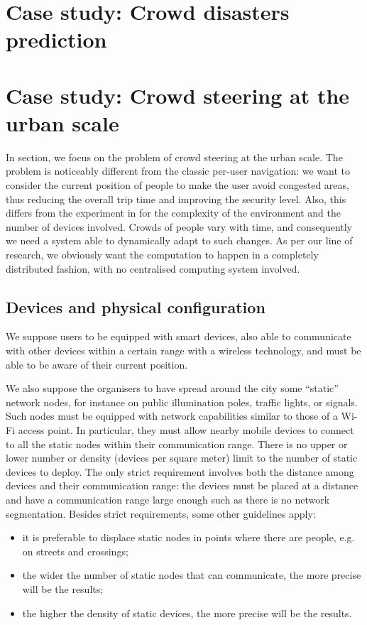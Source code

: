 \documentclass[12pt,a4paper,twoside,openright]{book}
\begin{document}
\chapter{Case study: Crowd disasters prediction}
\chapter{Case study: Crowd steering at the urban scale}
\label{ahpc-steering}
In section, we focus on the problem of crowd steering at the urban scale.
%
The problem is noticeably different from the classic per-user navigation: we want to consider the current position of people to make the user avoid congested areas, thus reducing the overall trip time and improving the security level.
%
Also, this differs from the experiment in  for the complexity of the environment and the number of devices involved.
%
Crowds of people vary with time, and consequently we need a system able to dynamically adapt to such changes.
%
As per our line of research, we obviously want the computation to happen in a completely distributed fashion, with no centralised computing system involved.

\section{Devices and physical configuration}

We suppose users to be equipped with smart devices, also able to communicate with other devices within a certain range with a wireless technology, and must be able to be aware of their current position.

We also suppose the organisers to have spread around the city some ``static'' network nodes, for instance on public illumination poles, traffic lights, or signals.
%
Such nodes must be equipped with network capabilities similar to those of a Wi-Fi access point.
%
In particular, they must allow nearby mobile devices to connect to all the static nodes within their communication range.
%
There is no upper or lower number or density (devices per square meter) limit to the number of static devices to deploy.
%
The only strict requirement involves both the distance among devices and their communication range: the devices must be placed at a distance and have a communication range large enough such as there is no network segmentation.
%
Besides strict requirements, some other guidelines apply:
\begin{itemize}
 \item it is preferable to displace static nodes in points where there are people, e.g. on streets and crossings;
 \item the wider the number of static nodes that can communicate, the more precise will be the results;
 \item the higher the density of static devices, the more precise will be the results.
\end{itemize}
\end{document}
